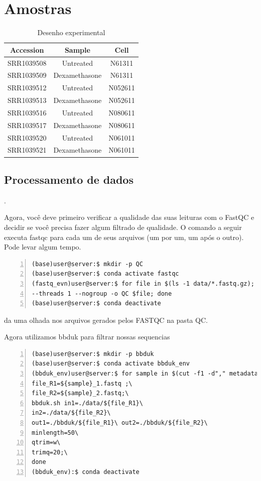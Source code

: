 \documentclass[letter,11pt]{book}
\begin{document}
\section{Amostras}
\begin{table}[h]
\begin{center}
\begin{tabular}{|c|c|c|}
\hline 
Accession&Sample&Cell\\
\hline
SRR1039508& Untreated& N61311 \\ \hline 
SRR1039509& Dexamethasone& N61311\\ \hline
SRR1039512& Untreated& N052611 \\ \hline 
SRR1039513& Dexamethasone& N052611\\ \hline
SRR1039516& Untreated& N080611 \\ \hline 
SRR1039517& Dexamethasone& N080611\\ \hline
SRR1039520& Untreated& N061011 \\ \hline 
SRR1039521& Dexamethasone& N061011\\ \hline
\end{tabular}
\caption{Desenho experimental} \label{table:1} \end{center}
\end{table}

\subsection{Processamento de dados}.

Agora, você deve primeiro verificar a qualidade das suas leituras com o FastQC e decidir se você precisa fazer algum filtrado de qualidade. O comando a seguir executa fastqc para cada um de seus arquivos (um por um, um após o outro). Pode levar algum tempo.

\begin{Verbatim}[commandchars=!\{\}, numbers=left,label= Verificação de qualidade nas leituras ,frame=topline,fontsize=\scriptsize]
(base)user@server:$ mkdir -p QC
(base)user@server:$ conda activate fastqc
(fastq_evn)user@server:$ for file in $(ls -1 data/*.fastq.gz); do fastqc --noextract \
--threads 1 --nogroup -o QC $file; done
(base)user@server:$ conda deactivate
\end{Verbatim}

da uma olhada nos arquivos gerados pelos FASTQC na pasta QC.

Agora utilizamos bbduk para filtrar nossas sequencias

\begin{Verbatim}[commandchars=!\{\}, numbers=left,label= Filtrado de sequencias ,frame=topline,fontsize=\scriptsize]
(base)user@server:$ mkdir -p bbduk
(base)user@server:$ conda activate bbduk_env
(bbduk_env)user@server:$ for sample in $(cut -f1 -d"," metadata.csv | grep SRR); do\
file_R1=${sample}_1.fastq ;\
file_R2=${sample}_2.fastq;\
bbduk.sh in1=./data/${file_R1}\
in2=./data/${file_R2}\
out1=./bbduk/${file_R1}\ out2=./bbduk/${file_R2}\
minlength=50\
qtrim=w\
trimq=20;\
done
(bbduk_env):$ conda deactivate
\end{Verbatim}
\end{document}
